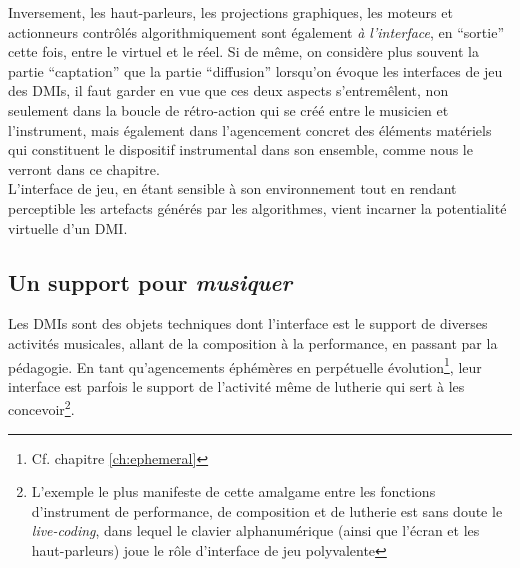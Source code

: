 \indent Inversement, les haut-parleurs, les projections graphiques, les moteurs et actionneurs contrôlés algorithmiquement sont également \textit{à l'interface}, en ``sortie'' cette fois, entre le virtuel et le réel. Si de même, on considère plus souvent la partie ``captation'' que la partie ``diffusion'' lorsqu'on évoque les interfaces de jeu des \glspl{DMI}, il faut garder en vue que ces deux aspects s'entremêlent, non seulement dans la boucle de rétro-action qui se créé entre le musicien et l'instrument, mais également dans l'agencement concret des éléments matériels qui constituent le dispositif instrumental dans son ensemble, comme nous le verront dans ce chapitre.\\
\indent L'interface de jeu, en étant sensible à son environnement tout en rendant perceptible les artefacts générés par les algorithmes, vient incarner la potentialité virtuelle d'un \gls{DMI}.


\subsection{Un support pour \textit{musiquer}}

\noindent Les \glspl{DMI} sont des objets techniques dont l'interface est le support de diverses activités musicales, allant de la composition à la performance, en passant par la pédagogie. En tant qu'agencements éphémères en perpétuelle évolution\footnote{Cf. chapitre \ref{ch:ephemeral}}, leur interface est parfois le support de l'activité même de lutherie qui sert à les concevoir\footnote{L'exemple le plus manifeste de cette amalgame entre les fonctions d'instrument de performance, de composition et de lutherie est sans doute le \textit{live-coding}, dans lequel le clavier alphanumérique (ainsi que l'écran et les haut-parleurs) joue le rôle d'interface de jeu polyvalente}.

